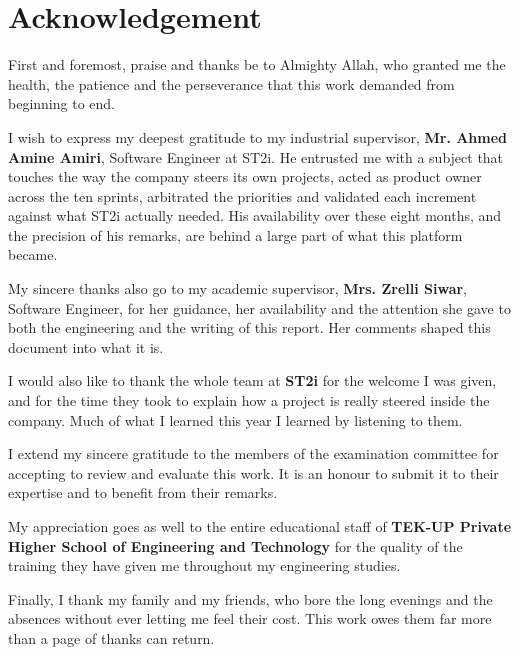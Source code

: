 \chapter*{\huge Acknowledgement}
\vspace{8mm}

First and foremost, praise and thanks be to Almighty Allah, who granted me the health, the
patience and the perseverance that this work demanded from beginning to end.

I wish to express my deepest gratitude to my industrial supervisor, \textbf{Mr. Ahmed Amine
Amiri}, Software Engineer at ST2i. He entrusted me with a subject that touches the way the
company steers its own projects, acted as product owner across the ten sprints, arbitrated the
priorities and validated each increment against what ST2i actually needed. His availability over
these eight months, and the precision of his remarks, are behind a large part of what this
platform became.

My sincere thanks also go to my academic supervisor, \textbf{Mrs. Zrelli Siwar}, Software
Engineer, for her guidance, her availability and the attention she gave to both the engineering
and the writing of this report. Her comments shaped this document into what it is.

I would also like to thank the whole team at \textbf{ST2i} for the welcome I was given, and for
the time they took to explain how a project is really steered inside the company. Much of what I
learned this year I learned by listening to them.

I extend my sincere gratitude to the members of the examination committee for accepting to review
and evaluate this work. It is an honour to submit it to their expertise and to benefit from their
remarks.

My appreciation goes as well to the entire educational staff of \textbf{TEK-UP Private Higher
School of Engineering and Technology} for the quality of the training they have given me
throughout my engineering studies.

Finally, I thank my family and my friends, who bore the long evenings and the absences without
ever letting me feel their cost. This work owes them far more than a page of thanks can return.

